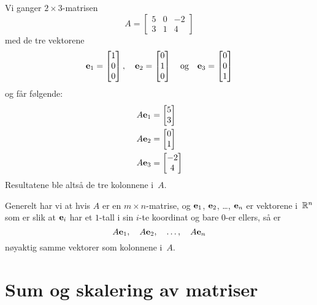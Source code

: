 \begin{ex}
Vi ganger $2 \times 3$-matrisen
\[
A =
\begin{bmatrix}
5 & 0 & -2 \\
3 & 1 &  4
\end{bmatrix}
\]
med de tre vektorene
\[
\mathbf{e}_1 = \begin{bmatrix} 1 \\ 0 \\ 0 \end{bmatrix},\quad
\mathbf{e}_2 = \begin{bmatrix} 0 \\ 1 \\ 0 \end{bmatrix}\quad\text{og}\quad
\mathbf{e}_3 = \begin{bmatrix} 0 \\ 0 \\ 1 \end{bmatrix}
\]
og får følgende:
\begin{align*}
A \mathbf{e}_1 &= \begin{bmatrix} 5 \\ 3 \end{bmatrix} \\
A \mathbf{e}_2 &= \begin{bmatrix} 0 \\ 1 \end{bmatrix} \\
A \mathbf{e}_3 &= \begin{bmatrix} -2 \\ 4 \end{bmatrix}
\end{align*}
Resultatene ble altså de tre kolonnene i~$A$.
\end{ex}

Generelt har vi at hvis $A$ er en $m \times n$-matrise, og $\mathbf{e}_1$,
$\mathbf{e}_2$, \ldots, $\mathbf{e}_n$ er vektorene i~$\mathbb{R}^n$ som er slik at
$\mathbf{e}_i$ har et $1$-tall i sin $i$-te koordinat og bare $0$-er
ellers, så er
\[
A \mathbf{e}_1,\quad
A \mathbf{e}_2,\quad
\ldots,\quad
A \mathbf{e}_n
\]
nøyaktig samme vektorer som kolonnene i~$A$.


\section*{Sum og skalering av matriser}

